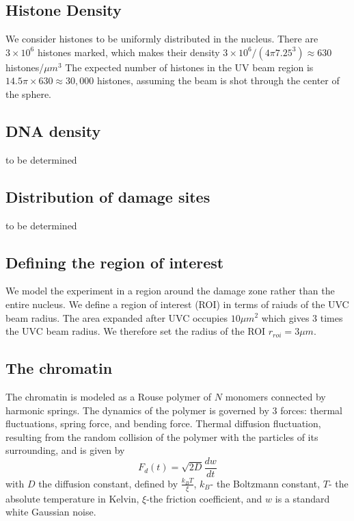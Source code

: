 \documentclass[12pt]{report}
\begin{document}
    \subsection{Histone Density}
		We consider histones to be uniformly distributed in the nucleus. There are $3\times 10^6$ histones marked, which makes their density $3\times 10^6 /(4 \pi 7.25^3)\approx 630$ histones/$\mu m^3$
		The expected number of histones in the UV beam region is $14.5\pi \times 630\approx 30,000$ histones, assuming the beam is shot through the center of the sphere. 
    
    \subsection{DNA density}
	to be determined	
	
	\subsection{Distribution of damage sites}
	to be determined
	
	\subsection{Defining the region of interest}
	We model the experiment in a region around the damage zone rather than the entire nucleus. We define a region of interest (ROI) in terms of raiuds of the UVC beam radius. The area expanded after UVC occupies $10 \mu m^2$ which gives 3 times the UVC beam radius. We therefore set the radius of the ROI $r_{roi}=3\mu m$.
					    
	\subsection{The chromatin}	
     The chromatin is modeled as a Rouse polymer of $N$ monomers connected by harmonic springs. The dynamics of the polymer is governed by 3 forces: thermal fluctuations, spring force, and bending force.
     Thermal diffusion fluctuation, resulting from the random collision of the polymer with the particles of its surrounding, and is given by 
     \begin{equation*}
     F_d(t) = \sqrt{2D}\frac{dw}{dt}
     \end{equation*}
      with $D$ the diffusion constant, defined by $\frac{k_BT}{\xi}$, $k_B$- the Boltzmann constant, $T$- the absolute temperature in Kelvin, $\xi$-the friction coefficient, and $w$ is a standard white Gaussian noise. 
            
\end{document}
